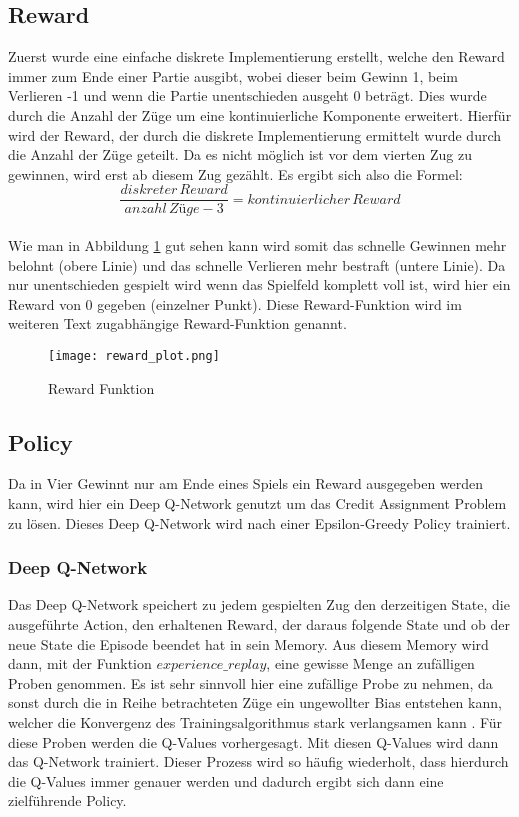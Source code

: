 \subsection{Reward}
 Zuerst wurde eine einfache diskrete Implementierung erstellt, welche den Reward immer zum Ende einer Partie ausgibt, wobei dieser beim Gewinn 1, beim Verlieren -1 und wenn die Partie unentschieden ausgeht 0 beträgt.
Dies wurde durch die Anzahl der Züge um eine kontinuierliche Komponente erweitert. Hierfür wird der Reward, der durch die diskrete Implementierung ermittelt wurde durch die Anzahl der Züge geteilt. Da es nicht möglich ist vor dem vierten Zug zu gewinnen, wird erst ab diesem Zug gezählt. Es ergibt sich also die Formel: \\$$\frac{diskreter\, Reward}{anzahl\, Züge-3}= kontinuierlicher\, Reward$$\\
Wie man in Abbildung \ref{fig:reward_function} gut sehen kann wird somit das schnelle Gewinnen mehr belohnt (obere Linie) und das schnelle Verlieren mehr bestraft (untere Linie). Da nur unentschieden gespielt wird wenn das Spielfeld komplett voll ist, wird hier ein Reward von 0 gegeben (einzelner Punkt). Diese Reward-Funktion wird im weiteren Text zugabhängige Reward-Funktion genannt. \\

\begin{figure}[h!]
  \texttt{[image: reward\_plot.png]}
  \centering
  \caption{Reward Funktion}
  \label{fig:reward_function}
\end{figure}
\newpage
\subsection{Policy}
Da in Vier Gewinnt nur am Ende eines Spiels ein Reward ausgegeben werden kann, wird hier ein Deep Q-Network genutzt um das Credit Assignment Problem zu lösen. 
Dieses Deep Q-Network wird nach einer Epsilon-Greedy Policy trainiert.

\subsubsection{Deep Q-Network}
Das Deep Q-Network speichert zu jedem gespielten Zug den derzeitigen State, die ausgeführte Action, den erhaltenen Reward, der daraus folgende State und ob der neue State die Episode beendet hat in sein Memory. Aus diesem Memory wird dann, mit der Funktion $experience\_replay$, eine gewisse Menge an zufälligen Proben genommen. Es ist sehr sinnvoll hier eine zufällige Probe zu nehmen, da sonst durch die in Reihe betrachteten Züge ein ungewollter Bias entstehen kann, welcher die Konvergenz des Trainingsalgorithmus stark verlangsamen kann
\cite[Seite 469]{HandsOn2017}.
Für diese Proben werden die Q-Values vorhergesagt. Mit diesen Q-Values wird dann das Q-Network trainiert. 
Dieser Prozess wird so häufig wiederholt, dass hierdurch die Q-Values immer genauer  werden und dadurch ergibt sich dann eine zielführende Policy.



